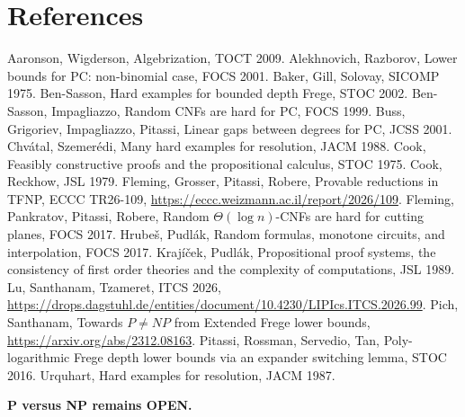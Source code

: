 \documentclass[11pt]{article}
\theoremstyle{definition}
\begin{document}
\section*{References}
\small
Aaronson, Wigderson, Algebrization, TOCT 2009. Alekhnovich, Razborov, Lower bounds for PC: non-binomial case, FOCS 2001. Baker, Gill, Solovay, SICOMP 1975. Ben-Sasson, Hard examples for bounded depth Frege, STOC 2002. Ben-Sasson, Impagliazzo, Random CNFs are hard for PC, FOCS 1999. Buss, Grigoriev, Impagliazzo, Pitassi, Linear gaps between degrees for PC, JCSS 2001. Chv\'atal, Szemer\'edi, Many hard examples for resolution, JACM 1988. Cook, Feasibly constructive proofs and the propositional calculus, STOC 1975. Cook, Reckhow, JSL 1979. Fleming, Grosser, Pitassi, Robere, Provable reductions in TFNP, ECCC TR26-109, \url{https://eccc.weizmann.ac.il/report/2026/109}. Fleming, Pankratov, Pitassi, Robere, Random $\Theta(\log n)$-CNFs are hard for cutting planes, FOCS 2017. Hrube\v{s}, Pudl\'ak, Random formulas, monotone circuits, and interpolation, FOCS 2017. Kraj\'i\v{c}ek, Pudl\'ak, Propositional proof systems, the consistency of first order theories and the complexity of computations, JSL 1989. Lu, Santhanam, Tzameret, ITCS 2026, \url{https://drops.dagstuhl.de/entities/document/10.4230/LIPIcs.ITCS.2026.99}. Pich, Santhanam, Towards $P\ne NP$ from Extended Frege lower bounds, \url{https://arxiv.org/abs/2312.08163}. Pitassi, Rossman, Servedio, Tan, Poly-logarithmic Frege depth lower bounds via an expander switching lemma, STOC 2016. Urquhart, Hard examples for resolution, JACM 1987.

\bigskip\noindent\textbf{P versus NP remains OPEN.}
\end{document}
